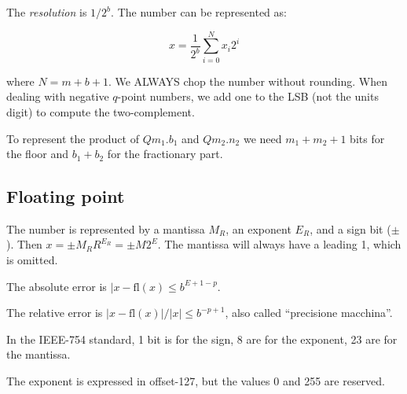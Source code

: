 \documentclass[12pt,a4paper]{report}
\numberwithin{equation}{section}
\theoremstyle{definition}
\theoremstyle{remark}
\begin{document}
The \emph{resolution} is $1/2^b$. The number can be represented as:

\begin{equation}
x = \frac{1}{2^b} \sum_{i=0}^N x_i 2^i
\end{equation}

where $N=m+b+1$. We ALWAYS chop the number without rounding. When dealing with negative $q$-point numbers, we add one to the LSB (not the units digit) to compute the two-complement.

To represent the product of $Qm_1.b_1$ and $Qm_2.n_2$ we need $m_1+m_2+1$ bits for the floor and $b_1 + b_2$ for the fractionary part.


\subsection{Floating point}

The number is represented by a mantissa $M_R$, an exponent $E_R$, and a sign bit ($\pm$). Then $x=\pm M_R R^{E_R} =\pm M 2^E$. The mantissa will always have a leading 1, which is omitted.

The absolute error is $|x-\text{fl}(x)\leq b^{E+1-p}$.

The relative error is $|x-\text{fl}(x)|/|x| \leq b^{-p+1}$, also called ``precisione macchina''.

In the IEEE-754 standard, 1 bit is for the sign, 8 are for the exponent, 23 are for the mantissa.

The exponent is expressed in offset-127, but the values 0 and 255 are reserved.

\tableofcontents
\end{document}
